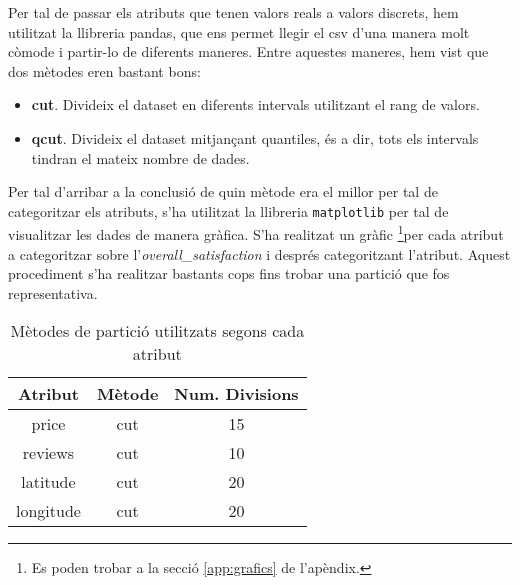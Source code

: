 

Per tal de passar els atributs que tenen valors reals a valors discrets, hem utilitzat la llibreria pandas, que ens permet llegir el csv d'una manera molt còmode i partir-lo de diferents maneres. Entre aquestes maneres, hem vist que dos mètodes eren bastant bons:
\begin{itemize}
	\item \textbf{cut}. Divideix el dataset en diferents intervals utilitzant el rang de valors.
	\item \textbf{qcut}. Divideix el dataset mitjançant quantiles, és a dir, tots els intervals tindran el mateix nombre de dades.
\end{itemize}
Per tal d'arribar a la conclusió de quin mètode era el millor per tal de categoritzar els atributs, s'ha utilitzat la llibreria \texttt{matplotlib} per tal de visualitzar les dades de manera gràfica. S'ha realitzat un gràfic \footnote{Es poden trobar a la secció \ref{app:grafics} de l'apèndix.}per cada atribut a categoritzar sobre l'\textit{overall\_satisfaction} i després categoritzant l'atribut. Aquest procediment s'ha realitzar bastants cops fins trobar una partició que fos representativa. 

\begin{table}[H]
	\centering
\begin{tabular}{ccc}
	Atribut &Mètode & Num. Divisions\\\hline
	price & cut & 15 \\
	reviews & cut & 10 \\
	latitude & cut & 20 \\
	longitude & cut & 20 \\
\end{tabular}
\caption{Mètodes de partició utilitzats segons cada atribut}
\end{table}

